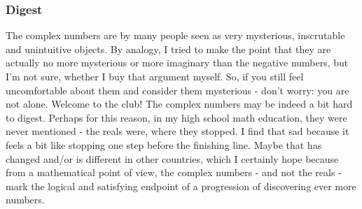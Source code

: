 

\subsubsection{Digest}
The complex numbers are by many people seen as very mysterious, inscrutable and unintuitive objects. By analogy, I tried to make the point that they are actually no more mysterious or more imaginary than the negative numbers, but I'm not sure, whether I buy that argument myself. So, if you still feel uncomfortable about them and consider them mysterious - don't worry: you are not alone. Welcome to the club! The complex numbers may be indeed a bit hard to digest. Perhaps for this reason, in my high school math education, they were never mentioned - the reals were, where they stopped. I find that sad because it feels a bit like stopping one step before the finishing line. Maybe that has changed and/or is different in other countries, which I certainly hope because from a mathematical point of view, the complex numbers - and not the reals - mark the logical and satisfying endpoint of a progression of discovering ever more numbers.


